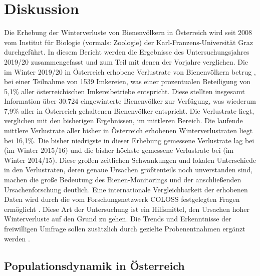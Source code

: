 \section{Diskussion}

Die Erhebung der Winterverluste von Bienenvölkern in Österreich wird seit 2008 vom Institut für Biologie (vormals: Zoologie) der Karl-Franzens-Universität Graz durchgeführt. In diesem Bericht werden die Ergebnisse des Untersuchungsjahres 2019/20 zusammengefasst und zum Teil mit denen der Vorjahre verglichen. Die im Winter 2019/20 in Österreich erhobene Verlustrate von Bienenvölkern betrug , bei einer Teilnahme von 1539 Imkereien, was einer prozentualen Beteiligung von 5,1\% aller österreichischen Imkereibetriebe entspricht. Diese stellten insgesamt Information über 30.724 eingewinterte Bienenvölker zur Verfügung, was wiederum 7,9\% aller in Österreich gehaltenen Bienenvölker entspricht. Die Verlustrate liegt, verglichen mit den bisherigen Ergebnissen, im mittleren Bereich. Die laufende mittlere Verlustrate aller bisher in Österreich erhobenen Winterverlustraten liegt bei 16,1\%. Die bisher niedrigste in dieser Erhebung gemessene Verlustrate lag bei  (im Winter 2015/16) und die bisher höchste gemessene Verlustrate bei  (im Winter 2014/15). Diese großen zeitlichen Schwankungen und lokalen Unterschiede in den Verlustraten, deren genaue Ursachen größtenteils noch unverstanden sind, machen die große Bedeutung des Bienen-Monitorings und der anschließenden Ursachenforschung deutlich. Eine internationale Vergleichbarkeit der erhobenen Daten wird durch die vom Forschungsnetzwerk COLOSS festgelegten Fragen ermöglicht \citep{brodschneider2016,brodschneider2018,vanderzee2013}. Diese Art der Untersuchung ist ein Hilfsmittel, den Ursachen hoher Winterverluste auf den Grund zu gehen. Die Trends und Erkenntnisse der freiwilligen Umfrage sollen zusätzlich durch gezielte Probenentnahmen ergänzt werden \citep{vanderzee2015}.

\subsection{Populationsdynamik in Österreich}

